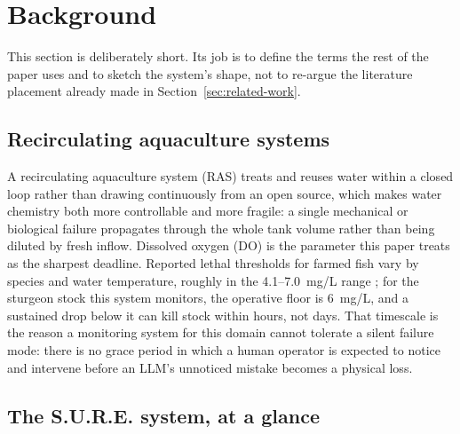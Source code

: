 \section{Background}
\label{sec:background}

This section is deliberately short. Its job is to define the terms the rest of the paper uses and
to sketch the system's shape, not to re-argue the literature placement already made in
Section~\ref{sec:related-work}.

\subsection{Recirculating aquaculture systems}

A recirculating aquaculture system (RAS) treats and reuses water within a closed loop rather than
drawing continuously from an open source, which makes water chemistry both more controllable and
more fragile: a single mechanical or biological failure propagates through the whole tank volume
rather than being diluted by fresh inflow. Dissolved oxygen (DO) is the parameter this paper treats
as the sharpest deadline. Reported lethal thresholds for farmed fish vary by species and water
temperature, roughly in the 4.1--7.0~mg/L range \citep{lindholm2023waterquality,
agmrc2026waterquality}; for the sturgeon stock this system monitors, the operative floor is
6~mg/L, and a sustained drop below it can kill stock within hours, not days. That timescale is the
reason a monitoring system for this domain cannot tolerate a silent failure mode: there is no
grace period in which a human operator is expected to notice and intervene before an LLM's
unnoticed mistake becomes a physical loss.

\subsection{The S.U.R.E. system, at a glance}

